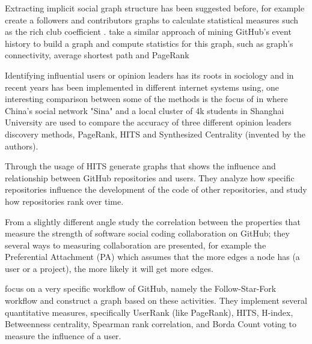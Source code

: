 \documentclass[sigconf,11pt]{acmart}
\begin{document}
Extracting implicit social graph structure has been suggested before,
for example \citeauthor{coding-together} \cite{coding-together} create a followers and contributors graphs
to calculate statistical measures such as the rich club coefficient \cite{wiki:rich-club-coefficient}.
\citeauthor{network-structure-social-coding}\cite{network-structure-social-coding} take a similar approach
of mining GitHub's event history to build a graph and compute statistics for this graph, such as
graph's connectivity, average shortest path and PageRank\cite{pagerank}

Identifying influential users or opinion leaders has its roots in sociology and in recent years has been
implemented in different internet systems using, one interesting comparison
between some of the methods is the focus of \citeauthor{identifying-top-n} in \cite{identifying-top-n}
where China's social network "Sina" and a local cluster of 4k students in Shanghai University are used
to compare the accuracy of three different opinion leaders discovery methods,
PageRank, HITS\cite{hits} and Synthesized Centrality (invented by the authors).

\citeauthor{influence-analysis-of-github-repositories}\cite{influence-analysis-of-github-repositories}
Through the usage of HITS generate graphs that shows the influence and relationship between GitHub
repositories and users.
They analyze how specific repositories influence the development of the code of other repositories,
and study how repositories rank over time.

From a slightly different angle \citeauthor{collaboration-strength-metrics-github}\cite{collaboration-strength-metrics-github}
study the correlation between the properties that measure the strength of software social coding
collaboration on GitHub; they several ways to measuring collaboration are presented, for example
the Preferential Attachment (PA) which assumes that the more edges a node has (a user or a project),
the more likely it will get more edges.

\citeauthor{user-influence-analysis-github}\cite{user-influence-analysis-github} focus on a very specific
workflow of GitHub, namely the Follow-Star-Fork workflow and construct a graph based on these activities.
They implement several quantitative measures, specifically UserRank (like PageRank), HITS, H-index\cite{wiki:h-index},
Betweenness centrality\cite{betweenness}, Spearman rank correlation\cite{wiki:spearman},
and Borda Count voting\cite{wiki:borda} to measure the influence of a user.
\end{document}
